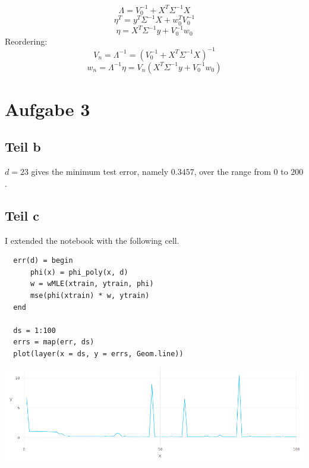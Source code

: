 \documentclass[10pt,a4paper]{article}
\begin{document}
\begin{equation}
  \Lambda = V_{0}^{-1} + X^{T}\Sigma^{-1}X
\end{equation}
\begin{equation}
  \eta^{T} = y^{T}\Sigma^{-1}X + w_{0}^{T}V_{0}^{-1}
\end{equation}
\begin{equation}
  \eta = X^{T}\Sigma^{-1}y + V_{0}^{-1}w_{0}
\end{equation}
Reordering:
\begin{equation}
  V_{n} = \Lambda^{-1} = (V_{0}^{-1} + X^{T}\Sigma^{-1}X)^{-1}
\end{equation}
\begin{equation}
  w_{n} = \Lambda^{-1}\eta = V_{n}(X^{T}\Sigma^{-1}y + V_{0}^{-1}w_{0})
\end{equation}

\section{Aufgabe 3}

\subsection{Teil b}

$d = 23$ gives the minimum test error, namely $0.3457$, over the range from $0$
to $200$.

\subsection{Teil c}

I extended the notebook with the following cell.
\begin{lstlisting}
  err(d) = begin
      phi(x) = phi_poly(x, d)
      w = wMLE(xtrain, ytrain, phi)
      mse(phi(xtrain) * w, ytrain)
  end

  ds = 1:100
  errs = map(err, ds)
  plot(layer(x = ds, y = errs, Geom.line))
\end{lstlisting}
\includegraphics[width=500pt]{4_3_c.png}
\end{document}
